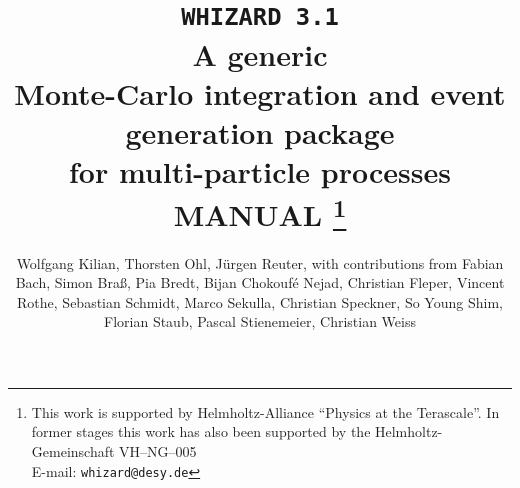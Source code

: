 \documentclass[12pt]{book}
\makeatletter
\def\preprintno#1{\def\@preprintno{#1}}
\newcommand{\ttt}[1]{\texttt{#1}}
\makeatother
\begin{document}
\preprintno{}
\title{%
 \ttt{\huge WHIZARD 3.1} \\[\baselineskip]
 A generic \\ Monte-Carlo integration and event generation package \\
 for multi-particle processes\\[\baselineskip]
 MANUAL
 \footnote{%
 This work is supported by Helmholtz-Alliance ``Physics at the
 Terascale''.
 In former stages this work has also been supported by
 the Helmholtz-Gemeinschaft VH--NG--005 \\
 E-mail: \ttt{whizard@desy.de}
 }
 \\[\baselineskip]
}
\author{%
  Wolfgang Kilian, %
  Thorsten Ohl, %
  J\"urgen Reuter, %
  with contributions from
  Fabian Bach, %
  Simon Bra\ss, %
  Pia Bredt, %
  Bijan Chokouf\'{e} Nejad, %
  Christian Fleper, %
  Vincent Rothe, %
  Sebastian Schmidt, %
  Marco Sekulla, %
  Christian Speckner, %
  So Young Shim, %
  Florian Staub, %
  Pascal Stienemeier, %
  Christian Weiss}
\end{document}
